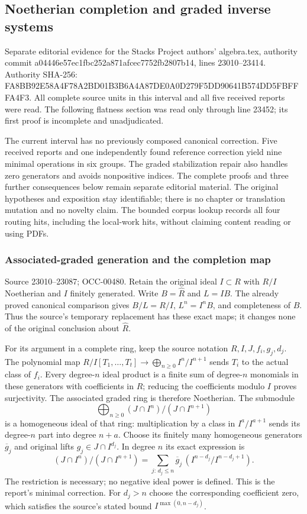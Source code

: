 \subsection{Noetherian completion and graded inverse systems}\label{noetherian-completion-and-graded-inverse-systems}

Separate editorial evidence for the Stacks Project authors' algebra.tex, authority commit a04446e57ec1fbc252a871afcec7752fb2807b14, lines 23010--23414. Authority SHA-256: FA8BB92E58A4F78A2BD01B3B6A4A87DE0A0D279F5DD90641B574DD5FBFFFA4F3. All complete source units in this interval and all five received reports were read. The following flatness section was read only through line 23452; its first proof is incomplete and unadjudicated.

The current interval has no previously composed canonical correction. Five received reports and one independently found reference correction yield nine minimal operations in six groups. The graded stabilization repair also handles zero generators and avoids nonpositive indices. The complete proofs and three further consequences below remain separate editorial material. The original hypotheses and exposition stay identifiable; there is no chapter or translation mutation and no novelty claim. The bounded corpus lookup records all four routing hits, including the local-work hits, without claiming content reading or using PDFs.

\subsubsection{Associated-graded generation and the completion map}\label{associated-graded-generation-and-the-completion-map}

Source 23010--23087; OCC-00480. Retain the original ideal \(I\subset R\) with \(R/I\) Noetherian and \(I\) finitely generated. Write \(B=\widehat R\) and \(L=IB\). The already proved canonical comparison gives \(B/L=R/I\), \(L^n=I^nB\), and completeness of \(B\). Thus the source's temporary replacement has these exact maps; it changes none of the original conclusion about \(\widehat R\).

For its argument in a complete ring, keep the source notation \(R,I,J,f_i,g_j,d_j\). The polynomial map \(R/I[T_1,\ldots,T_t]\to\bigoplus_{n\geq0}I^n/I^{n+1}\) sends \(T_i\) to the actual class of \(f_i\). Every degree-\(n\) ideal product is a finite sum of degree-\(n\) monomials in these generators with coefficients in \(R\); reducing the coefficients modulo \(I\) proves surjectivity. The associated graded ring is therefore Noetherian. The submodule \[
\bigoplus_{n\geq0}(J\cap I^n)/(J\cap I^{n+1})
\] is a homogeneous ideal of that ring: multiplication by a class in \(I^a/I^{a+1}\) sends its degree-\(n\) part into degree \(n+a\). Choose its finitely many homogeneous generators \(\overline g_j\) and original lifts \(g_j\in J\cap I^{d_j}\). In degree \(n\) its exact expression is \[
(J\cap I^n)/(J\cap I^{n+1})
 =\sum_{j:\,d_j\leq n}
    \overline g_j\,(I^{n-d_j}/I^{n-d_j+1}).
\] The restriction is necessary; no negative ideal power is defined. This is the report's minimal correction. For \(d_j>n\) choose the corresponding coefficient zero, which satisfies the source's stated bound \(I^{\max(0,n-d_j)}\).

